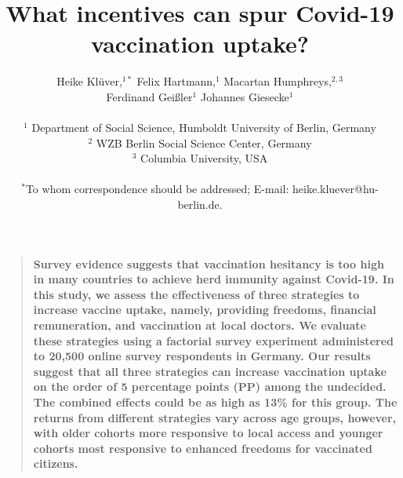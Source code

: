 \documentclass[12pt]{article}
\title{What incentives can spur Covid-19 vaccination uptake?}
\author
{Heike Klüver,$^{1\ast}$ Felix Hartmann,$^{1}$  Macartan Humphreys,$^{2,3}$\\ Ferdinand Geißler$^{1}$  Johannes Giesecke$^{1}$\\
\\
\normalsize{$^{1}$ Department of Social Science, Humboldt University of Berlin, Germany}\\
\normalsize{$^{2}$ WZB Berlin Social Science Center, Germany}\\
\normalsize{$^{3}$ Columbia University, USA}\\
\\
\normalsize{$^\ast$To whom correspondence should be addressed; E-mail:  heike.kluever@hu-berlin.de.}
}
\date{}
\renewcommand\hl[1]{#1}
\newenvironment{sciabstract}{%
\begin{quote} \bf}
{\end{quote}}
\begin{document}
 


\baselineskip24pt


\maketitle 



\begin{sciabstract}
Survey evidence suggests that vaccination hesitancy is too high in many countries to achieve herd immunity against Covid-19. In this study, we assess the effectiveness of three strategies to increase vaccine uptake, namely, providing freedoms, financial remuneration, and vaccination at local doctors. We evaluate these strategies   using a factorial survey experiment administered to 20,500 online survey respondents in Germany. Our results suggest that all three strategies can increase vaccination uptake on the order of 5 percentage points (PP) among the undecided. The combined effects could be as high as 13\% for this group. \hl{The returns from different strategies vary across age groups, however, with older cohorts more responsive to local access and younger cohorts most responsive to enhanced freedoms for vaccinated citizens.}
\end{sciabstract}



\end{document}
